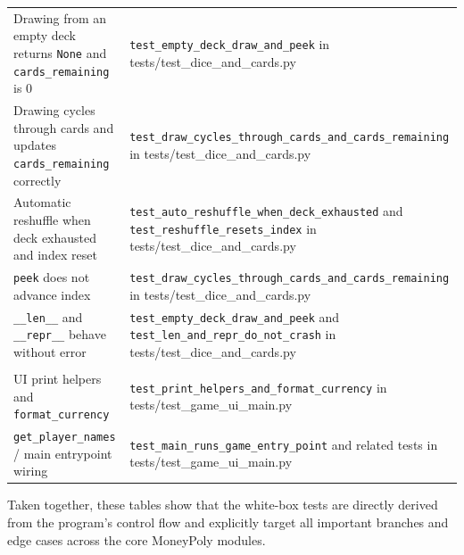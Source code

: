 \documentclass[11pt]{article}
\begin{document}
\begin{longtable}{>{\raggedright\arraybackslash}p{} >{\raggedright\arraybackslash}p{}}
\multicolumn{2}{l}{\textbf{moneypoly.cards: CardDeck}} \\ \hline
Drawing from an empty deck returns \texttt{None} and \texttt{cards\_remaining} is 0 & \texttt{test\_empty\_deck\_draw\_and\_peek} in tests/test\_dice\_and\_cards.py \\ \hline
Drawing cycles through cards and updates \texttt{cards\_remaining} correctly & \texttt{test\_draw\_cycles\_through\_cards\_and\_cards\_remaining} in tests/test\_dice\_and\_cards.py \\ \hline
Automatic reshuffle when deck exhausted and index reset & \texttt{test\_auto\_reshuffle\_when\_deck\_exhausted} and \texttt{test\_reshuffle\_resets\_index} in tests/test\_dice\_and\_cards.py \\ \hline
\texttt{peek} does not advance index & \texttt{test\_draw\_cycles\_through\_cards\_and\_cards\_remaining} in tests/test\_dice\_and\_cards.py \\ \hline
\texttt{\_\_len\_\_} and \texttt{\_\_repr\_\_} behave without error & \texttt{test\_empty\_deck\_draw\_and\_peek} and \texttt{test\_len\_and\_repr\_do\_not\_crash} in tests/test\_dice\_and\_cards.py \\ \hline

\multicolumn{2}{l}{\textbf{moneypoly.ui and main}} \\ \hline
UI print helpers and \texttt{format\_currency} & \texttt{test\_print\_helpers\_and\_format\_currency} in tests/test\_game\_ui\_main.py \\ \hline
\texttt{get\_player\_names} / main entrypoint wiring & \texttt{test\_main\_runs\_game\_entry\_point} and related tests in tests/test\_game\_ui\_main.py \\ \hline
\end{longtable}

Taken together, these tables show that the white-box tests are directly derived from the program's control flow and explicitly target all important branches and edge cases across the core MoneyPoly modules.
\end{document}

